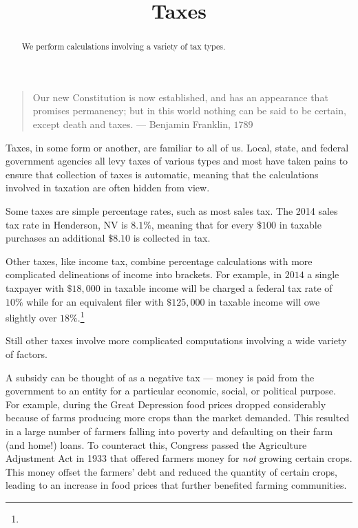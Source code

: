 \documentclass{ximera}
\title{Taxes}
\begin{document}
\begin{abstract}
We perform calculations involving a variety of tax types.
\end{abstract}
\maketitle
\begin{quote}
Our new Constitution is now established, and has an appearance that promises permanency; but in this world nothing can be said to be certain, except death and taxes. --- Benjamin Franklin, $1789$
\end{quote}

Taxes, in some form or another, are familiar to all of us. Local, state, and federal government agencies all levy taxes of various types and most have taken pains to ensure that collection of taxes is automatic, meaning that the calculations involved in taxation are often hidden from view.

Some taxes are simple percentage rates, such as most sales tax. The 2014 sales tax rate in Henderson, NV is $8.1\%$, meaning that for every $\$100$ in taxable purchases an additional $\$8.10$ is collected in tax.

Other taxes, like income tax, combine percentage calculations with more complicated delineations of income into brackets. For example, in $2014$ a single taxpayer with $\$18,000$ in taxable income will be charged a federal tax rate of $10\%$ while for an equivalent filer with $\$125,000$ in taxable income will owe slightly over $18\%$.\footnote{}

Still other taxes involve more complicated computations involving a wide variety of factors. 

A subsidy can be thought of as a negative tax --- money is paid from the government to an entity for a particular economic, social, or political purpose. For example, during the Great Depression food prices dropped considerably because of farms producing more crops than the market demanded. This resulted in a large number of farmers falling into poverty and defaulting on their farm (and home!) loans. To counteract this, Congress passed the Agriculture Adjustment Act in 1933 that offered farmers money for \emph{not} growing certain crops. This money offset the farmers' debt and reduced the quantity of certain crops, leading to an increase in food prices that further benefited farming communities.
\end{document}
